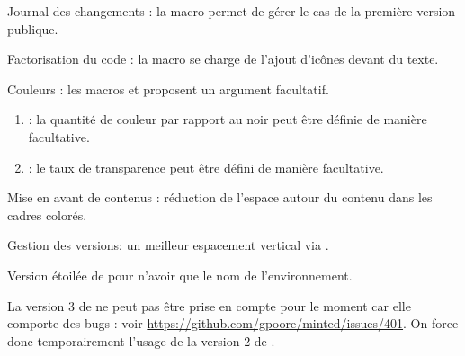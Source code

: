 \begin{tdocnew}
    \item Journal des changements : la macro  permet de gérer le cas de la première version publique.

    \item Factorisation du code : la macro  se charge de l'ajout d'icônes devant du texte.
\end{tdocnew}


\begin{tdocupdate}
    \item Couleurs : les macros  et  proposent un argument facultatif.
    \begin{enumerate}
        \item {} : la quantité de couleur par rapport au noir peut être définie de manière facultative.

        \item {} : le taux de transparence peut être défini de manière facultative.
    \end{enumerate}

    \item Mise en avant de contenus : réduction de l'espace autour du contenu dans les cadres colorés.

    \item Gestion des versions: un meilleur espacement vertical via .
\end{tdocupdate}

\tdocsep




\begin{tdocnew}[version = 1.3.1, date = 2024-09-26]
    \item Version étoilée de  pour n'avoir que le nom de l'environnement.
\end{tdocnew}

\tdocsep




\begin{tdoctech}[version = 1.3.0, date = 2024-09-25]
    \item La version 3 de  ne peut pas être prise en compte pour le moment car elle comporte des bugs : voir \url{https://github.com/gpoore/minted/issues/401}. On force donc temporairement l'usage de la version 2 de .
\end{tdoctech}


